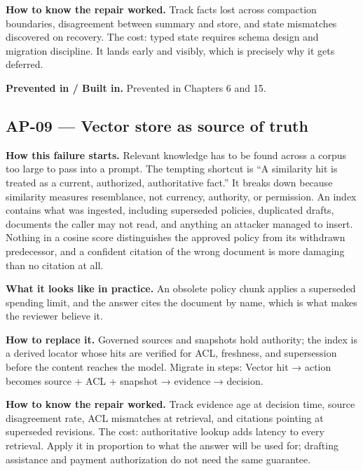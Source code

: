 \textbf{How to know the repair worked.} Track facts lost across compaction boundaries, disagreement between summary and store, and state mismatches discovered on recovery. The cost: typed state requires schema design and migration discipline. It lands early and visibly, which is precisely why it gets deferred.\par

\textbf{Prevented in / Built in.} Prevented in Chapters 6 and 15.\par

\subsection{AP-09 — Vector store as source of truth}

\textbf{How this failure starts.} Relevant knowledge has to be found across a corpus too large to pass into a prompt. The tempting shortcut is “A similarity hit is treated as a current, authorized, authoritative fact.” It breaks down because similarity measures resemblance, not currency, authority, or permission. An index contains what was ingested, including superseded policies, duplicated drafts, documents the caller may not read, and anything an attacker managed to insert. Nothing in a cosine score distinguishes the approved policy from its withdrawn predecessor, and a confident citation of the wrong document is more damaging than no citation at all.\par

\textbf{What it looks like in practice.} An obsolete policy chunk applies a superseded spending limit, and the answer cites the document by name, which is what makes the reviewer believe it.\par

\textbf{How to replace it.} Governed sources and snapshots hold authority; the index is a derived locator whose hits are verified for ACL, freshness, and supersession before the content reaches the model. Migrate in steps: Vector hit → action becomes source + ACL + snapshot → evidence → decision.\par

\textbf{How to know the repair worked.} Track evidence age at decision time, source disagreement rate, ACL mismatches at retrieval, and citations pointing at superseded revisions. The cost: authoritative lookup adds latency to every retrieval. Apply it in proportion to what the answer will be used for; drafting assistance and payment authorization do not need the same guarantee.\par


